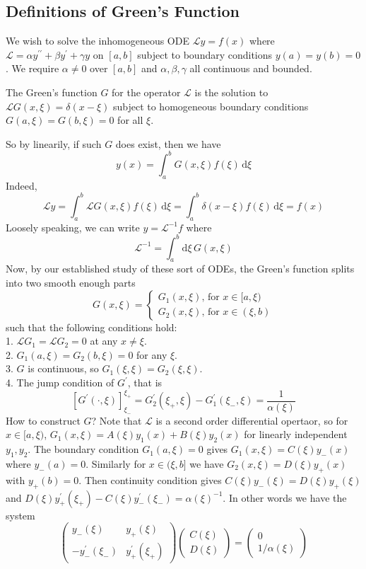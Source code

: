 \subsection{Definitions of Green's Function}
We wish to solve the inhomogeneous ODE $\mathcal Ly=f(x)$ where $\mathcal L=\alpha y^{\prime\prime}+\beta y^\prime+\gamma y$ on $[a,b]$ subject to boundary conditions $y(a)=y(b)=0$.
We require $\alpha\neq 0$ over $[a,b]$ and $\alpha,\beta,\gamma$ all continuous and bounded.
\begin{definition}
    The Green's function $G$ for the operator $\mathcal L$ is the solution to $\mathcal LG(x,\xi)=\delta(x-\xi)$ subject to homogeneous boundary conditions $G(a,\xi)=G(b,\xi)=0$ for all $\xi$.
\end{definition}
So by linearily, if such $G$ does exist, then we have
$$y(x)=\int_a^bG(x,\xi)f(\xi)\,\mathrm d\xi$$
Indeed,
$$\mathcal Ly=\int_a^b\mathcal LG(x,\xi)f(\xi)\,\mathrm d\xi=\int_a^b\delta(x-\xi)f(\xi)\,\mathrm d\xi=f(x)$$
Loosely speaking, we can write $y=\mathcal L^{-1}f$ where
$$\mathcal L^{-1}=\int_a^b\mathrm d\xi\, G(x,\xi)$$
Now, by our established study of these sort of ODEs, the Green's function splits into two smooth enough parts
$$G(x,\xi)=\begin{cases}
    G_1(x,\xi)\text{, for $x\in [a,\xi)$}\\
    G_2(x,\xi)\text{, for $x\in (\xi,b)$}
\end{cases}$$
such that the following conditions hold:\\
1. $\mathcal LG_1=\mathcal LG_2=0$ at any $x\neq\xi$.\\
2. $G_1(a,\xi)=G_2(b,\xi)=0$ for any $\xi$.\\
3. $G$ is continuous, so $G_1(\xi,\xi)=G_2(\xi,\xi)$.\\
4. The jump condition of $G^\prime$, that is
$$[G^\prime(\cdot,\xi)]^{\xi_+}_{\xi_-}=G_2^\prime(\xi_+,\xi)-G_1^\prime(\xi_-,\xi)=\frac{1}{\alpha(\xi)}$$
How to construct $G$?
Note that $\mathcal L$ is a second order differential opertaor, so for $x\in[a,\xi)$, $G_1(x,\xi)=A(\xi)y_1(x)+B(\xi)y_2(x)$ for linearly independent $y_1,y_2$.
The boundary condition $G_1(a,\xi)=0$ gives $G_1(x,\xi)=C(\xi)y_-(x)$ where $y_-(a)=0$.
Similarly for $x\in(\xi,b]$ we have $G_2(x,\xi)=D(\xi)y_+(x)$ with $y_+(b)=0$.
Then continuity condition gives $C(\xi)y_-(\xi)=D(\xi)y_+(\xi)$ and $D(\xi)y_+^\prime(\xi_+)-C(\xi)y_-^\prime(\xi_-)=\alpha(\xi)^{-1}$.
In other words we have the system
$$\begin{pmatrix}
    y_-(\xi)&y_+(\xi)\\
    -y_-^\prime(\xi_-)&y_+^\prime(\xi_+)
\end{pmatrix}\begin{pmatrix}
    C(\xi)\\
    D(\xi)
\end{pmatrix}=\begin{pmatrix}
    0\\
    1/\alpha(\xi)
\end{pmatrix}$$
